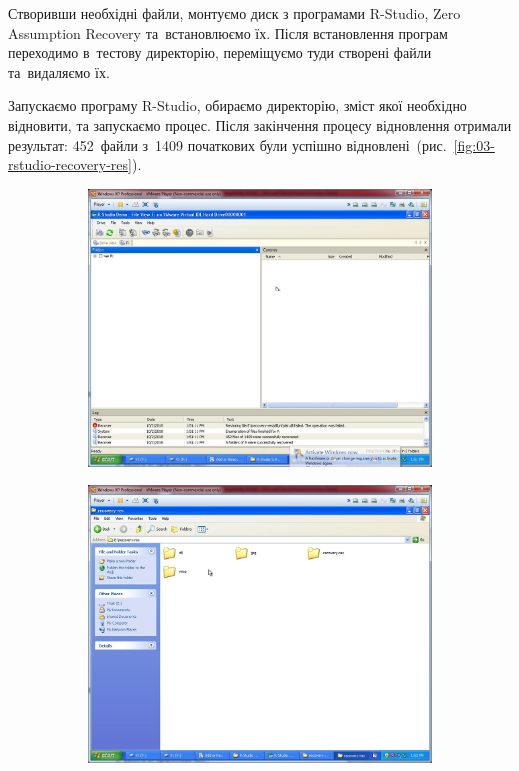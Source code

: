 \documentclass[
	a4paper,
	oneside,
	DIV = 12,
	fontsize = 13pt,
	headings = normal,
]{scrartcl}
\begin{document}
		Створивши необхідні файли, монтуємо диск з програмами \textenglish{R-Studio, Zero Assumption Recovery} та~встановлюємо їх. Після встановлення програм переходимо в~тестову директорію, переміщуємо туди створені файли та~видаляємо їх.

		Запускаємо програму \textenglish{R-Studio}, обираємо директорію, зміст якої необхідно відновити, та запускаємо процес. Після закінчення процесу відновлення отримали результат: 452~файли з~1409 початкових були успішно відновлені~(рис.~\ref{fig:03-rstudio-recovery-res}).

		\begin{figure}[!htbp]
			\centering
			\begin{subfigure}{0.5\columnwidth}
				\centering
				\includegraphics[height = 9.5\baselineskip]{./assets/y03s01-pcdiag-lab-03-p05.jpg}
				\caption{}
				\label{subfig:03-01-rstudio-window}
			\end{subfigure}%
			\begin{subfigure}{0.5\columnwidth}
				\centering
				\includegraphics[height = 9.5\baselineskip]{./assets/y03s01-pcdiag-lab-03-p06.jpg}

\end{subfigure}
\end{figure}
\end{document}
